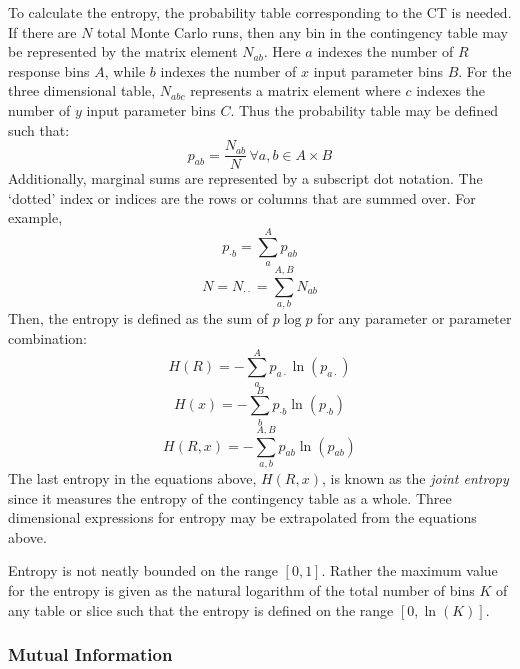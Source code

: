 \documentclass[preprint,12pt]{elsarticle}
\begin{document}
To calculate the entropy, the probability table corresponding to the CT is needed.  If there are $N$ total Monte Carlo runs, then any bin in
the contingency table may be represented by the matrix element $N_{ab}$.  Here $a$ indexes the number of $R$ response bins $A$, while $b$
indexes the number of $x$ input parameter bins $B$.  For the three dimensional table, $N_{abc}$ represents a matrix element where $c$ indexes the number of $y$
input parameter bins $C$.  Thus the probability table may be defined such that:
\begin{equation} p_{ab} = \frac{N_{ab}}{N} \, \forall a, b\in A\times B\end{equation}
Additionally, marginal sums are represented by a subscript dot notation.  The `dotted' index or indices are the rows or columns that are summed over.  For example,
\begin{equation} p_{\cdot b} = \sum_a^A p_{ab} \end{equation}
\begin{equation} N = N_{\cdot \cdot} = \sum_{a,b}^{A,B} N_{ab} \end{equation}
Then, the entropy is defined as the sum of $p\log p$ for any parameter or parameter combination:
\begin{equation} H(R) = - \sum_a^A p_{a \cdot} \ln(p_{a \cdot}) \end{equation}
\begin{equation} H(x) = - \sum_b^B p_{\cdot b} \ln(p_{\cdot b}) \end{equation}
\begin{equation} H(R,x) = - \sum_{a,b}^{A,B} p_{ab} \ln(p_{ab}) \end{equation}
The last entropy in the equations above, $H(R,x)$, is known as the \emph{joint entropy} since it measures the entropy of the contingency table as a whole.
Three dimensional expressions for entropy may be extrapolated from the equations above.

Entropy is not neatly bounded on the range $[0,1]$.
Rather the maximum value for the entropy is given as the natural logarithm of the total number of bins $K$ of any table or slice such that
the entropy is defined on the range $[0, \ln(K)]$.

\subsubsection{Mutual Information}
\label{sec:mutual_information}
\end{document}
